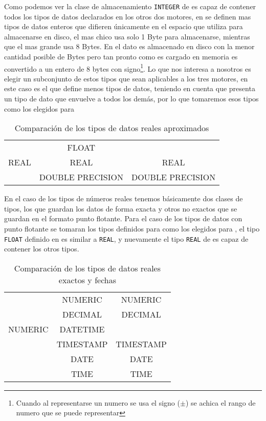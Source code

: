%
Como podemos ver la clase de almacenamiento \verb=INTEGER= de \s es capaz de contener todos los tipos de datos declarados en los otros dos motores, en \m se definen mas tipos de datos enteros que  difieren únicamente en el espacio que utiliza para almacenarse en disco, el mas chico usa  solo 1 Byte para almacenarse, mientras que el mas grande usa 8 Bytes. En \s el dato es almacenado en disco con la menor cantidad posible de Bytes pero tan pronto como es cargado en memoria es convertido a un entero de 8 bytes con signo\footnote{Cuando al representarse un numero se usa el signo ($\pm$) se achica el rango de numero que se puede representar}. Lo que nos  interesa a nosotros es elegir un subconjunto de estos tipos que sean aplicables a los tres motores, en este caso es \p el que define menos tipos de datos, teniendo en cuenta que \s presenta un tipo de dato que envuelve a todos los demás, por lo que tomaremos esos tipos como los elegidos para \jj
%
\begin{table}[h]
\begin{center}
\begin{tabular}{|c|c|c|}
\hline \s   & \m               & \p \\  
\hline      & FLOAT            &  \\ 
       REAL & REAL             & REAL \\
            & DOUBLE PRECISION & DOUBLE PRECISION \\
\hline 
\end{tabular} 
\end{center}
\caption{Comparación de los tipos de datos reales aproximados}
\end{table}
%
En el caso de los tipos de números reales tenemos básicamente dos clases de tipos, los que guardan los datos de forma exacta y otros no exactos que se guardan en el formato punto flotante. Para el caso de los tipos de datos con punto flotante se tomaran los tipos definidos para \p como los elegidos para \jj, el tipo \verb=FLOAT= definido en \m es similar a \verb=REAL=, y nuevamente el tipo \verb=REAL= de \s es capaz de contener los otros tipos. 
%
\begin{table}[h]
\begin{center}
\begin{tabular}{|c|c|c|}
\hline \s & \m & \p \\  
\hline  & NUMERIC & NUMERIC \\
  & DECIMAL & DECIMAL \\
NUMERIC  & DATETIME &  \\
  & TIMESTAMP & TIMESTAMP \\
  & DATE & DATE \\
  & TIME & TIME \\  
\hline 
\end{tabular} 
\end{center}
\caption{Comparación de los tipos de datos reales exactos y fechas}
\end{table}
